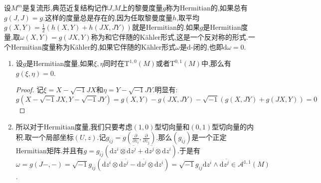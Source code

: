 设$M^m$是复流形,典范近复结构记作$J$,$M$上的黎曼度量$g$称为Hermitian的,如果总有$g(J,J)=g$.这样的度量总是存在的,因为任取黎曼度量$h$,取平均$g(X,Y)=\frac{1}{2}\left(h(X,Y)+h(JX,JY)\right)$就是Hermitian的.如果$g$是Hermitian度量,取$\omega(X,Y)=g(JX,Y)$称为和它伴随的K\"ahler形式,这是一个反对称的形式.一个Hermitian度量称为K\"ahler的,如果它伴随的K\"ahler形式$\omega$是$\mathrm{d}$-闭的,也即$\mathrm{d}\omega=0$.
\begin{enumerate}
	\item 设$g$是Hermitian度量,如果$\xi,\eta$同时在$\mathrm{T}^{1,0}(M)$或者$\mathrm{T}^{0,1}(M)$中,那么有$g(\xi,\eta)=0$.
	\begin{proof}
		
		记$\xi=X-\sqrt{-1}JX$和$\eta=Y-\sqrt{-1}JY$.明显有:
		$$g(X-\sqrt{-1}JX,Y-\sqrt{-1}JY)=g(X,Y)-g(JX,JY)-\sqrt{-1}\left(g(X,JY)+g(JX,Y)\right)=0$$
	\end{proof}
    \item 所以对于Hermitian度量,我们只要考虑$(1,0)$型切向量和$(0,1)$型切向量的内积.取一个局部坐标$(U,z)$.记$g_{i\overline{j}}=g\left(\frac{\partial}{\partial z_i},\frac{\partial}{\partial\overline{z_j}}\right)$.那么$\left(g_{i\overline{j}}\right)$是一个正定Hermitian矩阵.并且有$g=g_{i\overline{j}}\left(\mathrm{d}z^i\otimes\mathrm{d}\overline{z^j}+\mathrm{d}\overline{z^j}\otimes\mathrm{d}z^i\right)$.于是有$\omega=g(J-,-)=\sqrt{-1}g_{i\overline{j}}\left(\mathrm{d}z^i\otimes\mathrm{d}\overline{z^j}-\mathrm{d}\overline{z^j}\otimes\mathrm{d}z^i\right)=\sqrt{-1}g_{i\overline{j}}\mathrm{d}z^i\wedge\mathrm{d}\overline{z^j}\in\mathscr{A}^{1,1}(M)$.
\end{enumerate}

